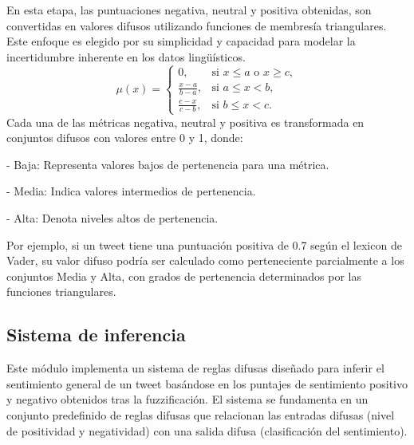 \documentclass[sigconf, review=false, nonacm]{acmart}
\begin{document}
En esta etapa, las puntuaciones negativa, neutral y positiva obtenidas, son convertidas en valores difusos
utilizando funciones de membresía triangulares. Este enfoque es elegido por su simplicidad y capacidad para
modelar la incertidumbre inherente en los datos lingüísticos.
$$
	\mu(x) =
	\begin{cases}
		0,                   & \text{si } x \leq a \text{ o } x \geq c, \\
		\frac{x - a}{b - a}, & \text{si } a \leq x < b,                 \\
		\frac{c - x}{c - b}, & \text{si } b \leq x < c.
	\end{cases}
$$
Cada una de las métricas negativa, neutral y positiva es transformada en conjuntos difusos con valores
entre 0 y 1, donde:

- Baja: Representa valores bajos de pertenencia para una métrica.

- Media: Indica valores intermedios de pertenencia.

- Alta: Denota niveles altos de pertenencia.

Por ejemplo, si un tweet tiene una puntuación positiva de 0.7 según el lexicon de Vader,
su valor difuso podría ser calculado como perteneciente parcialmente a los conjuntos Media y Alta,
con grados de pertenencia determinados por las funciones triangulares.

\subsection{Sistema de inferencia}
Este módulo implementa un sistema de reglas difusas diseñado para inferir el sentimiento general de un
tweet basándose en los puntajes de sentimiento positivo y negativo obtenidos tras la fuzzificación.
El sistema se fundamenta en un conjunto predefinido de reglas difusas que relacionan las entradas
difusas (nivel de positividad y negatividad) con una salida difusa (clasificación del sentimiento).
\end{document}

